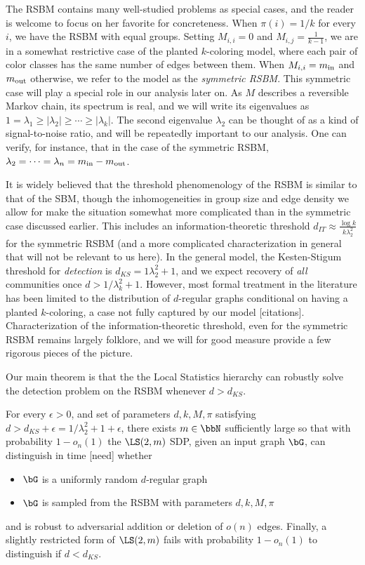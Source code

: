 The RSBM contains many well-studied problems as special cases, and the reader is welcome to focus on her favorite for concreteness. When $\pi(i) = 1/k$ for every $i$, we have the RSBM with equal groups. Setting $M_{i,i} = 0$ and $M_{i,j} = \tfrac{1}{k-1}$, we are in a somewhat restrictive case of the planted $k$-coloring model, where each pair of color classes has the same number of edges between them. When $M_{i,i} = m_{\textup{in}}$ and $m_{\textup{out}}$ otherwise, we refer to the model as the \emph{symmetric RSBM}. This symmetric case will play a special role in our analysis later on. As $M$ describes a reversible Markov chain, its spectrum is real, and we will write its eigenvalues as $1 = \lambda_1 \ge |\lambda_2| \ge \cdots \ge |\lambda_k|$. The second eigenvalue $\lambda_2$ can be thought of as a kind of signal-to-noise ratio, and will be repeatedly important to our analysis. One can verify, for instance, that in the case of the symmetric RSBM, $\lambda_2 = \cdots = \lambda_n = m_{\textup{in}} - m_{\textup{out}}$.

It is widely believed that the threshold phenomenology of the RSBM is similar to that of the SBM, though the inhomogeneities in group size and edge density we allow for make the situation somewhat more complicated than in the symmetric case discussed earlier. This includes an information-theoretic threshold $d_{IT} \approx \frac{\log k}{k\lambda_2^2}$ for the symmetric RSBM (and a more complicated characterization in general that will not be relevant to us here). In the general model, the Kesten-Stigum threshold for \emph{detection} is $d_{KS} = 1\lambda_2^2 + 1$, and we expect recovery of \emph{all} communities once $d> 1/\lambda_k^2 + 1$. However, most formal treatment in the literature has been limited to the distribution of $d$-regular graphs conditional on having a planted $k$-coloring, a case not fully captured by our model [citations]. Characterization of the information-theoretic threshold, even for the symmetric RSBM remains largely folklore, and we will for good measure provide a few rigorous pieces of the picture. 

Our main theorem is that the the Local Statistics hierarchy can robustly solve the detection problem on the RSBM whenever $d > d_{KS}$.

\begin{theorem} \label{thm:main}
	For every $\epsilon > 0$, and set of parameters $d,k,M,\pi$ satisfying $d > d_{KS} + \epsilon = 1/\lambda_2^2 + 1 + \epsilon$, there exists $m \in \bbN$ sufficiently large so that with probability $1-o_n(1)$ the $\LS(2,m)$ SDP, given an input graph $\bG$, can distinguish in time [need] whether
	\begin{itemize}
		\item $\bG$ is a uniformly random $d$-regular graph
		\item $\bG$ is sampled from the RSBM with parameters $d,k,M,\pi$
	\end{itemize}
	and is robust to adversarial addition or deletion of $o(n)$ edges. Finally, a slightly restricted form of $\LS(2,m)$  fails with probability $1-o_n(1)$ to distinguish if $d<d_{KS}$.
\end{theorem}

